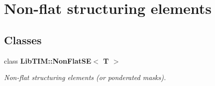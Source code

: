 \section{Non-flat structuring elements}
\label{group__NonFlatSE}
\subsection*{Classes}
\begin{CompactItemize}
\item 
class {\bf Lib\-TIM::Non\-Flat\-SE$<$ T $>$}
\begin{CompactList}\small\item\em Non-flat structuring elements (or ponderated masks). \item\end{CompactList}\end{CompactItemize}
